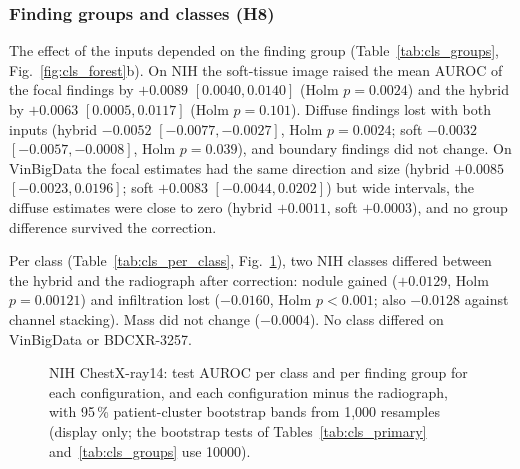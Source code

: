 \subsubsection{Finding groups and classes (H8)}
The effect of the inputs depended on the finding group (Table~\ref{tab:cls_groups}, Fig.~\ref{fig:cls_forest}b). On NIH the soft-tissue
image raised the mean AUROC of the focal findings by $+0.0089$ $[0.0040,0.0140]$ (Holm $p=0.0024$) and the hybrid by $+0.0063$
$[0.0005,0.0117]$ (Holm $p=0.101$). Diffuse findings lost with both inputs (hybrid $-0.0052$ $[-0.0077,-0.0027]$, Holm $p=0.0024$; soft
$-0.0032$ $[-0.0057,-0.0008]$, Holm $p=0.039$), and boundary findings did not change. On VinBigData the focal estimates had the same direction
and size (hybrid $+0.0085$ $[-0.0023,0.0196]$; soft $+0.0083$ $[-0.0044,0.0202]$) but wide intervals, the diffuse estimates were close to
zero (hybrid $+0.0011$, soft $+0.0003$), and no group difference survived the correction.

\begin{table}[htbp]
\centering\footnotesize
\caption{H8: difference in the mean per-class AUROC of each finding group, with 95\,\% cluster-bootstrap intervals; Holm within dataset over
groups and contrasts.}
\label{tab:cls_groups}
\end{table}

Per class (Table~\ref{tab:cls_per_class}, Fig.~\ref{fig:cls_per_class}), two NIH classes differed between the hybrid and the
radiograph after correction: nodule gained ($+0.0129$, Holm $p=0.00121$) and infiltration lost ($-0.0160$, Holm $p<0.001$; also $-0.0128$
against channel stacking). Mass did not change ($-0.0004$). No class differed on VinBigData or BDCXR-3257.

\begin{table}[htbp]
\centering\footnotesize
\caption{H8 per class: test AUROC of the radiograph and hybrid seed ensembles and the paired DeLong contrasts of the hybrid against the
radiograph and against channel stacking; Holm within dataset over classes and both contrasts.}
\label{tab:cls_per_class}
\end{table}

\begin{figure}[htbp]
\centering
{}
\caption{NIH ChestX-ray14: test AUROC per class and per finding group for each configuration, and each configuration minus the radiograph,
with 95\,\% patient-cluster bootstrap bands from 1,000 resamples (display only; the bootstrap tests of Tables~\ref{tab:cls_primary}
and~\ref{tab:cls_groups} use \num{10000}).}
\label{fig:cls_per_class}
\end{figure}

